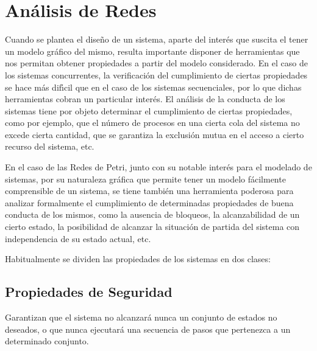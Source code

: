 \section{An\'{a}lisis de Redes}

Cuando se plantea el dise\~{n}o de un sistema, aparte del inter\'{e}s que
suscita el tener un modelo gr\'{a}fico del mismo, resulta importante
disponer de herramientas que nos permitan obtener propiedades
a partir del modelo considerado. En el caso de los sistemas
concurrentes, la verificaci\'{o}n del cumplimiento de ciertas
propiedades se hace m\'{a}s dif\'{\i}cil que en el caso de los sistemas
secuenciales, por lo que dichas herramientas cobran un particular
inter\'{e}s. El an\'{a}lisis de la conducta de los sistemas tiene por objeto
determinar el cumplimiento de ciertas propiedades, como por ejemplo,
que el n\'{u}mero de procesos en una cierta cola del sistema no excede
cierta cantidad, que se garantiza la exclusi\'{o}n mutua en el acceso
a cierto recurso del sistema, etc.

En el caso de las Redes de Petri, junto con su notable inter\'{e}s para
el modelado de sistemas, por su naturaleza gr\'{a}fica que permite
tener un modelo f\'{a}cilmente comprensible de un sistema,
se tiene tambi\'{e}n una herramienta poderosa para analizar formalmente
el cumplimiento de determinadas propiedades de buena conducta
de los mismos,
como la ausencia de bloqueos, la alcanzabilidad de un cierto
estado, la posibilidad de alcanzar la situaci\'{o}n de partida
del sistema con independencia de su estado actual, etc.

\medskip
Habitualmente se dividen las propiedades de los sistemas en dos
clases:

\subsection{Propiedades de Seguridad}

Garantizan que el sistema no
alcanzar\'{a} nunca un conjunto de estados no deseados, o
que nunca ejecutar\'{a} una secuencia de pasos que pertenezca a un
determinado conjunto.

